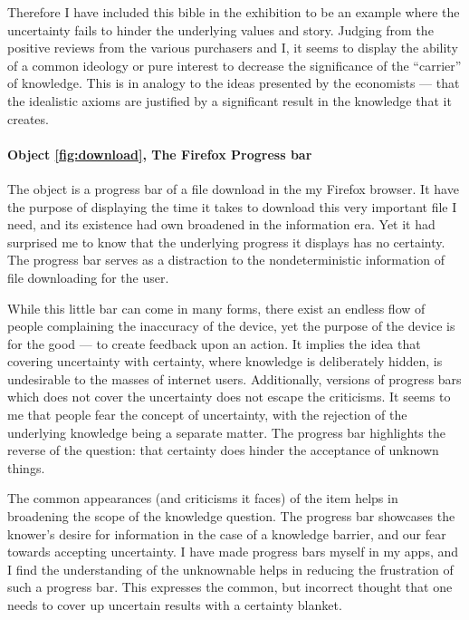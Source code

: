 \documentclass[a4paper,12pt]{article}
\begin{document}
Therefore I have included this bible in the exhibition to be an example where the uncertainty fails to hinder the underlying values and story. Judging from the positive reviews from the various purchasers and I, it seems to display the ability of a common ideology or pure interest to decrease the significance of the ``carrier'' of knowledge. This is in analogy to the ideas presented by the economists --- that the idealistic axioms are justified by a significant result in the knowledge that it creates.




\paragraph{Object \ref{fig:download}, The Firefox Progress bar}
The object is a progress bar of a file download in the my Firefox browser. It have the purpose of displaying the time it takes to download this very important file I need, and its existence had own broadened in the information era. Yet it had surprised me to know that the underlying progress it displays has no certainty. The progress bar serves as a distraction to the nondeterministic information of file downloading for the user.

While this little bar can come in many forms, there exist an endless flow of people complaining the inaccuracy of the device, yet the purpose of the device is for the good --- to create feedback upon an action. It implies the idea that covering uncertainty with certainty, where knowledge is deliberately hidden, is undesirable to the masses of internet users. Additionally, versions of progress bars which does not cover the uncertainty does not escape the criticisms. It seems to me that people fear the concept of uncertainty, with the rejection of the underlying knowledge being a separate matter. The progress bar highlights the reverse of the question: that certainty does hinder the acceptance of unknown things.

The common appearances (and criticisms it faces) of the item helps in broadening the scope of the knowledge question. The progress bar showcases the knower's desire for information in the case of a knowledge barrier, and our fear towards accepting uncertainty. I have made progress bars myself in my apps, and I find the understanding of the unknownable helps in reducing the frustration of such a progress bar. This expresses the common, but incorrect thought that one needs to cover up uncertain results with a certainty blanket.


\newpage
\nocite{*}
\printbibliography
\end{document}
